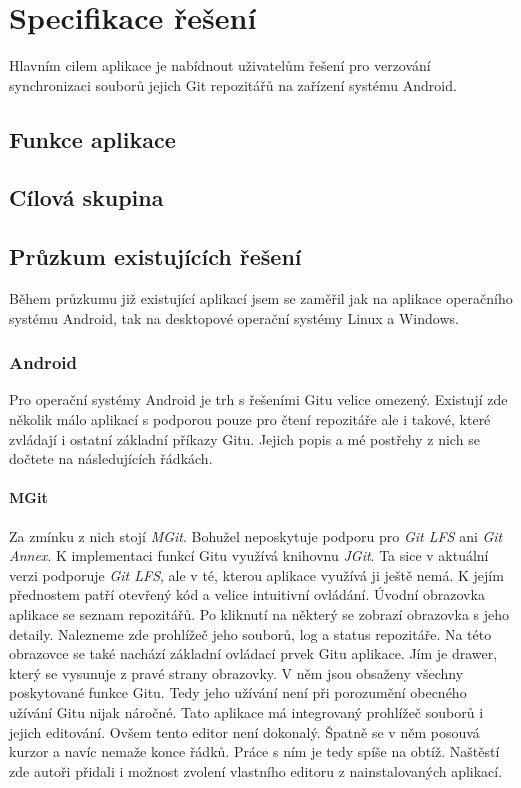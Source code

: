 \chapter{Specifikace řešení}
Hlavním cilem aplikace je nabídnout uživatelům řešení pro verzování synchronizaci souborů jejich Git repozitářů na zařízení systému Android.

\section{Funkce aplikace}

\section{Cílová skupina}

\section{Průzkum existujících řešení}
Během průzkumu již existující aplikací jsem se zaměřil jak na aplikace operačního systému Android, tak na desktopové operační systémy Linux a Windows.

    \subsection {Android}
    Pro operační systémy Android je trh s řešeními Gitu velice omezený. Existují zde několik málo aplikací s podporou pouze pro čtení repozitáře ale i takové, které zvládají i ostatní základní příkazy Gitu. Jejich popis a mé postřehy z nich se dočtete na následujících řádkách.
    \subsubsection{MGit}
    Za zmínku z nich stojí \emph{MGit}. Bohužel neposkytuje podporu pro \emph{Git LFS} ani \emph{Git Annex}. K implementaci funkcí Gitu využívá knihovnu \emph{JGit}. Ta sice v aktuální verzi podporuje \emph{Git LFS}, ale v té, kterou aplikace využívá ji ještě nemá. K jejím přednostem patří otevřený kód a velice intuitivní ovládání.
    Úvodní obrazovka aplikace se seznam repozitářů. Po kliknutí na některý se zobrazí obrazovka s jeho detaily. Nalezneme zde prohlížeč jeho souborů, log a status repozitáře. Na této obrazovce se také nachází základní ovládací prvek Gitu aplikace. Jím je drawer, který se vysunuje z pravé strany obrazovky. V něm jsou obsaženy všechny poskytované funkce Gitu. Tedy jeho užívání není při porozumění obecného užívání Gitu nijak náročné. Tato aplikace má integrovaný prohlížeč souborů i jejich editování. Ovšem tento editor není dokonalý. Špatně se v něm posouvá kurzor a navíc nemaže konce řádků. Práce s ním je tedy spíše na obtíž. Naštěstí zde autoři přidali i možnost zvolení vlastního editoru z nainstalovaných aplikací.

